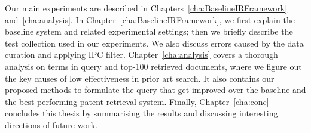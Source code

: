 Our main experiments are described in Chapters~\ref{cha:BaselineIRFramework} and~\ref{cha:analysis}. 
In Chapter~\ref{cha:BaselineIRFramework}, we first explain the baseline system and related experimental settings; 
then we briefly describe the test collection used in our experiments. We also discuss errors caused by the data curation and applying IPC filter.
Chapter~\ref{cha:analysis} covers a thorough analysis on terms in query and top-100 retrieved documents, where we figure out 
the key causes of low effectiveness in prior art search. It also contains our proposed methods to formulate the query that get improved over the baseline and the best performing patent retrieval system. 
Finally, Chapter~\ref{cha:conc} concludes this thesis by 
summarising the results and discussing interesting directions of future work.


